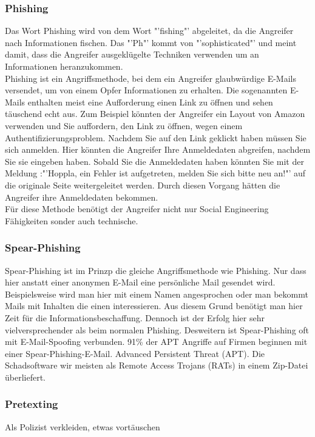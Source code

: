 \subsubsection{Phishing}
Das Wort Phishing wird von dem Wort "'fishing"' abgeleitet, da die Angreifer nach Informationen fischen. Das "'Ph"' kommt von "'sophisticated"' und meint damit, dass die Angreifer ausgeklügelte Techniken verwenden um an Informationen heranzukommen.\cite{PhishingExposed}\\
Phishing ist ein Angriffsmethode, bei dem ein Angreifer glaubwürdige E-Mails versendet, um von einem Opfer Informationen zu erhalten. Die sogenannten E-Mails enthalten meist eine Aufforderung einen Link zu öffnen und sehen täuschend echt aus. Zum Beispiel könnten der Angreifer ein Layout von Amazon verwenden und Sie auffordern, den Link zu öffnen, wegen einem Authentifizierungsproblem. Nachdem Sie auf den Link geklickt haben müssen Sie sich anmelden. Hier könnten die Angreifer Ihre Anmeldedaten abgreifen, nachdem Sie sie eingeben haben. Sobald Sie die Anmeldedaten haben könnten Sie mit der Meldung :"'Hoppla, ein Fehler ist aufgetreten, melden Sie sich bitte neu an!"' auf die originale Seite weitergeleitet werden. Durch diesen Vorgang hätten die Angreifer ihre Anmeldedaten bekommen.\\
Für diese Methode benötigt der Angreifer nicht nur Social Engineering Fähigkeiten sonder auch technische.\cite{PhishingDarkWaters}

\subsubsection{Spear-Phishing}
Spear-Phishing ist im Prinzp die gleiche Angriffsmethode wie Phishing. Nur dass hier anstatt einer anonymen E-Mail eine persönliche Mail gesendet wird. Beispielsweise wird man hier mit einem Namen angesprochen oder man bekommt Mails mit Inhalten die einen interessieren. Aus diesem Grund benötigt man hier Zeit für die Informationsbeschaffung. Dennoch ist der Erfolg hier sehr vielversprechender als beim normalen Phishing. Desweitern ist Spear-Phishing oft mit E-Mail-Spoofing verbunden.
91\% der APT Angriffe auf Firmen beginnen mit einer Spear-Phishing-E-Mail. Advanced Persistent Threat (APT). Die Schadsoftware wir meisten als Remote Access Trojans (RATs) in einem Zip-Datei überliefert.

\subsubsection{Pretexting}
Als Polizist verkleiden, etwas vortäuschen

